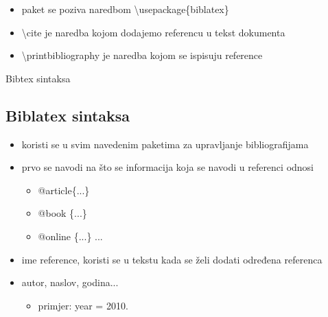 \documentclass{beamer}
\begin{document}
\begin{frame}
\begin{itemize}
	\item paket se poziva naredbom \textbackslash usepackage\{biblatex\}\\
	\item \textbackslash cite je naredba kojom dodajemo referencu u tekst dokumenta \\
	\item \textbackslash printbibliography je naredba kojom se ispisuju reference \\
\end{itemize}
\end{frame}

\begin{frame}{Bibtex sintaksa}
\subsection{Biblatex sintaksa}
\begin{itemize}
	\item koristi se u svim navedenim paketima za upravljanje bibliografijama \\
	\item prvo se navodi na što se informacija koja se navodi u referenci odnosi \\
	\begin{itemize}
		\item @article\{...\} \\
		\item @book \{...\}\\
		\item @online \{...\} ... \\
	\end{itemize}
	\item ime reference, koristi se u tekstu kada se želi dodati određena referenca \\
	\item autor, naslov, godina... 
		\begin{itemize}
			\item primjer: year = 2010.
		\end{itemize}
\end{itemize}
\end{frame}
\end{document}
